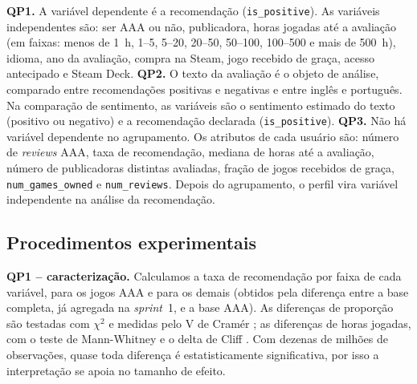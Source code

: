 \documentclass[12pt]{article}
\begin{document}
\textbf{QP1.} A variável dependente é a recomendação (\texttt{is\_positive}). As variáveis
independentes são: ser AAA ou não, publicadora, horas jogadas até a avaliação (em faixas: menos
de 1~h, 1--5, 5--20, 20--50, 50--100, 100--500 e mais de 500~h), idioma, ano da avaliação,
compra na Steam, jogo recebido de graça, acesso antecipado e Steam Deck.
\textbf{QP2.} O texto da avaliação é o objeto de análise, comparado entre recomendações positivas
e negativas e entre inglês e português. Na comparação de sentimento, as variáveis são o sentimento
estimado do texto (positivo ou negativo) e a recomendação declarada (\texttt{is\_positive}).
\textbf{QP3.} Não há variável dependente no agrupamento. Os atributos de cada usuário são: número
de \textit{reviews} AAA, taxa de recomendação, mediana de horas até a avaliação, número de
publicadoras distintas avaliadas, fração de jogos recebidos de graça, \texttt{num\_games\_owned} e
\texttt{num\_reviews}. Depois do agrupamento, o perfil vira variável independente na análise da
recomendação.

\subsection{Procedimentos experimentais}

\textbf{QP1 -- caracterização.} Calculamos a taxa de recomendação por faixa de cada variável,
para os jogos AAA e para os demais (obtidos pela diferença entre a base completa, já agregada na
\textit{sprint}~1, e a base AAA). As diferenças de proporção são testadas com $\chi^2$ e medidas
pelo V de Cramér \cite{cramer1946}; as diferenças de horas jogadas, com o teste de Mann-Whitney
\cite{mann1947} e o delta de Cliff \cite{cliff1993}. Com dezenas de milhões de observações,
quase toda diferença é estatisticamente significativa, por isso a interpretação se apoia no
tamanho de efeito.
\end{document}
